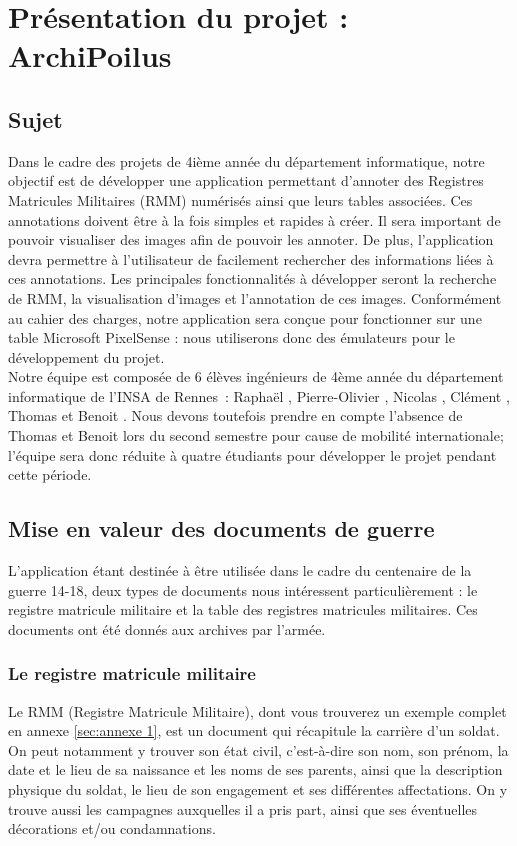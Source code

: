 \documentclass[a4paper]{article}
\begin{document}
\newpage

\section{Présentation du projet : ArchiPoilus}

\subsection{Sujet}

	Dans le cadre des projets de 4ième année du département informatique, notre objectif est de développer une application permettant d’annoter des Registres Matricules Militaires (RMM) numérisés ainsi que leurs tables associées. Ces annotations doivent être à la fois simples et rapides à créer. Il sera important de pouvoir visualiser des images afin de pouvoir les annoter. De plus, l’application devra permettre à l’utilisateur de facilement rechercher des informations liées à ces annotations. Les principales fonctionnalités à développer seront la recherche de RMM, la visualisation d’images et l’annotation de ces images. Conformément au cahier des charges, notre application sera conçue pour fonctionner sur une table Microsoft PixelSense : nous utiliserons donc des émulateurs pour le développement du projet.\\
	
	Notre équipe est composée de 6 élèves ingénieurs de 4ème année du département informatique de l’INSA de Rennes : Raphaël , Pierre-Olivier , Nicolas , Clément , Thomas  et Benoit . Nous devons toutefois prendre en compte l’absence de Thomas et Benoit lors du second semestre pour cause de mobilité internationale; l’équipe sera donc réduite à quatre étudiants pour développer le projet pendant cette période.

\subsection{Mise en valeur des documents de guerre}

	L'application étant destinée à être utilisée dans le cadre du centenaire de la guerre 14-18, deux types de documents nous intéressent particulièrement : le registre matricule militaire et la table des registres matricules militaires. Ces documents ont été donnés aux archives par l'armée.

\subsubsection{Le registre matricule militaire}
	Le RMM (Registre Matricule Militaire), dont vous trouverez un exemple complet en annexe \ref{sec:annexe 1}, est un document qui récapitule la carrière d'un soldat. On peut notamment y trouver son état civil, c'est-à-dire son nom, son prénom, la date et le lieu de sa naissance et les noms de ses parents, ainsi que la description physique du soldat, le lieu de son engagement et ses différentes affectations. On y trouve aussi les campagnes auxquelles il a pris part, ainsi que ses éventuelles décorations et/ou condamnations.\\
\end{document}
